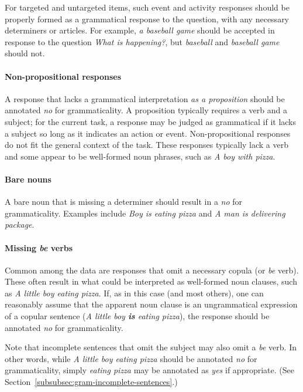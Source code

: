 \documentclass[12pt]{article}
\begin{document}
For targeted and untargeted items, such event and activity responses should be properly formed as a grammatical response to the question, with any necessary determiners or articles. For example, \textit{a baseball game} should be accepted in response to the question \textit{What is happening?}, but \textit{baseball} and \textit{baseball game} should not.

\paragraph{Non-propositional responses} \label{para:non-propositional} A response that lacks a grammatical interpretation \textit{as a proposition} should be annotated \textit{no} for grammaticality. A proposition typically requires a verb and a subject; for the current task, a response may be judged as grammatical if it lacks a subject so long as it indicates an action or event. Non-propositional responses do not fit the general context of the task. These responses typically lack a verb and some appear to be well-formed noun phrases, such as \textit{A boy with pizza}.

\paragraph{Bare nouns} A bare noun that is missing a determiner should result in a \textit{no} for grammaticality. Examples include \textit{Boy is eating pizza} and \textit{A man is delivering package}.

\paragraph{Missing \textit{be} verbs} Common among the data are responses that omit a necessary copula (or \textit{be} verb). These often result in what could be interpreted as well-formed noun clauses, such as \textit{A little boy eating pizza}. If, as in this case (and most others), one can reasonably assume that the apparent noun clause is an ungrammatical expression of a copular sentence (\textit{A little boy \textbf{is} eating pizza}), the response should be annotated \textit{no} for grammaticality. 

Note that incomplete sentences that omit the subject may also omit a \textit{be} verb. In other words, while \textit{A little boy eating pizza} should be annotated \textit{no} for grammaticality, simply \textit{eating pizza} may be annotated as \textit{yes} if appropriate. (See Section~\ref{subsubsec:gram-incomplete-sentences}.)
\end{document}
